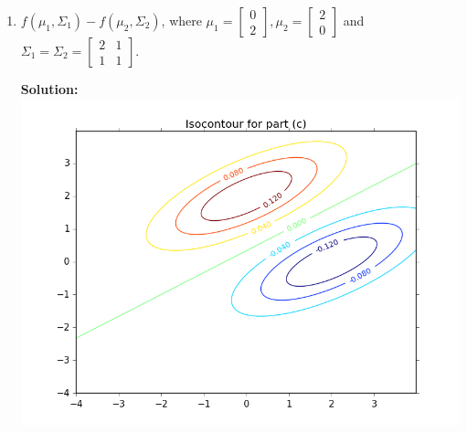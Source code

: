\documentclass{article}
\newcommand{\solution}{\textbf{Solution: }}
\begin{document}
\begin{enumerate}[label=(\alph*)]
    \newpage
    \item $f(\mu_1, \Sigma_1) - f(\mu_2, \Sigma_2)$, where $\mu_1 = \begin{bmatrix} 0 \\ 2 \end{bmatrix}, \mu_2 = \begin{bmatrix} 2 \\ 0 \end{bmatrix}$ and $\Sigma_1 = \Sigma_2 = \begin{bmatrix} 2 & 1 \\ 1 & 1 \end{bmatrix}$. 
    \begin{mdframed} \solution\\
    \includegraphics[scale=.75]{images/isocontour_c.png}
    \end{mdframed}
    

\end{enumerate}
\end{document}
